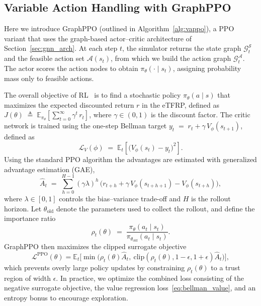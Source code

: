 \documentclass[a4paper,fleqn]{cas-sc}
\begin{document}
\subsection{Variable Action Handling with GraphPPO}\label{sec:ppo}
Here we introduce GraphPPO (outlined in Algorithm~\ref{alg:vappo}), a PPO~\cite{ppo} variant that uses the graph-based actor--critic architecture of Section~\ref{sec:gnn_arch}.
At each step $t$, the simulator returns the state graph $\mathcal{G}^{\mathcal{S}}_t$ and the feasible action set $\mathcal{A}(s_t)$, from which we build the action graph $\mathcal{G}^{\mathcal{A}}_t$. The actor scores the action nodes to obtain $\pi_\theta(\cdot\mid s_t)$, assigning probability mass only to feasible actions.

The overall objective of RL~\cite{SuttonReinforcementIntroduction} is to find a stochastic policy $\pi_\theta(a\mid s)$ that maximizes the expected discounted return $r$ in the eTFRP, defined as
$J(\theta)\;\triangleq\;\mathbb{E}_{\pi_\theta}\!\left[\sum_{t=0}^{\infty}\gamma^{t}\,r_t\right]$, where $\gamma\in(0,1)$ is the discount factor. 
The critic network is trained using the one-step Bellman target $y_t \;=\; r_t + \gamma\,V_\phi(s_{t+1})$, defined as
\begin{equation}
\mathcal{L}_V(\phi)\;=\;\mathbb{E}_t\!\left[\big(V_\phi(s_t)-y_t\big)^2\right].
\label{eq:bellman_value}
\end{equation}
Using the standard PPO algorithm the advantages are estimated with generalized advantage estimation (GAE),
\begin{equation}
\widehat{A}_t 
\;=\;
\sum_{h=0}^{H-1}(\gamma\lambda)^h\,\big( r_{t+h} + \gamma\,V_\phi(s_{t+h+1}) - V_\phi(s_{t+h}) \big),
\label{eq:gae}
\end{equation}
where $\lambda\in[0,1]$ controls the bias--variance trade-off and $H$ is the rollout horizon.
Let $\theta_{\mathrm{old}}$ denote the parameters used to collect the rollout, and define the importance ratio
\begin{equation}
\rho_t(\theta)\;=\;\frac{\pi_\theta(a_t\mid s_t)}{\pi_{\theta_{\mathrm{old}}}(a_t\mid s_t)}.
\label{eq:ratio}
\end{equation}
GraphPPO then maximizes the clipped surrogate objective
\begin{equation}
\mathcal{L}^{\mathrm{PPO}}(\theta)
=\mathbb{E}_t\Big[
\min\big(\rho_t(\theta)\widehat{A}_t,\ \mathrm{clip}(\rho_t(\theta),1-\epsilon,1+\epsilon)\widehat{A}_t\big)
\Big],
\label{eq:ppo_objective}
\end{equation}
which prevents overly large policy updates by constraining $\rho_t(\theta)$ to a trust region of width $\epsilon$. In practice, we optimize the combined loss consisting of the negative surrogate objective, the value regression loss~\eqref{eq:bellman_value}, and an entropy bonus to encourage exploration.
\end{document}
